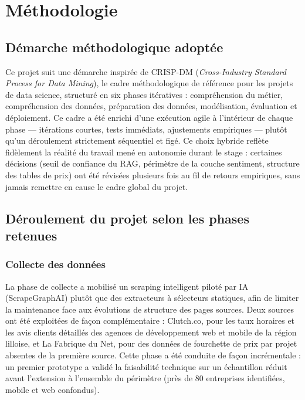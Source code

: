 \section{Méthodologie}

\subsection{Démarche méthodologique adoptée}

Ce projet suit une démarche inspirée de CRISP-DM (\textit{Cross-Industry Standard Process for Data Mining}),
le cadre méthodologique de référence pour les projets de data science, structuré en six phases itératives :
compréhension du métier, compréhension des données, préparation des données, modélisation, évaluation et
déploiement. Ce cadre a été enrichi d'une exécution agile à l'intérieur de chaque phase --- itérations
courtes, tests immédiats, ajustements empiriques --- plutôt qu'un déroulement strictement séquentiel et
figé. Ce choix hybride reflète fidèlement la réalité du travail mené en autonomie durant le stage : certaines
décisions (seuil de confiance du RAG, périmètre de la couche sentiment, structure des tables de prix) ont été
révisées plusieurs fois au fil de retours empiriques, sans jamais remettre en cause le cadre global du
projet.

\subsection{Déroulement du projet selon les phases retenues}

\subsubsection{Collecte des données}

La phase de collecte a mobilisé un scraping intelligent piloté par IA (ScrapeGraphAI) plutôt que des
extracteurs à sélecteurs statiques, afin de limiter la maintenance face aux évolutions de structure des
pages sources. Deux sources ont été exploitées de façon complémentaire : Clutch.co, pour les taux horaires
et les avis clients détaillés des agences de développement web et mobile de la région lilloise, et La
Fabrique du Net, pour des données de fourchette de prix par projet absentes de la première source. Cette
phase a été conduite de façon incrémentale : un premier prototype a validé la faisabilité technique sur un
échantillon réduit avant l'extension à l'ensemble du périmètre (près de 80 entreprises identifiées, mobile
et web confondus).

